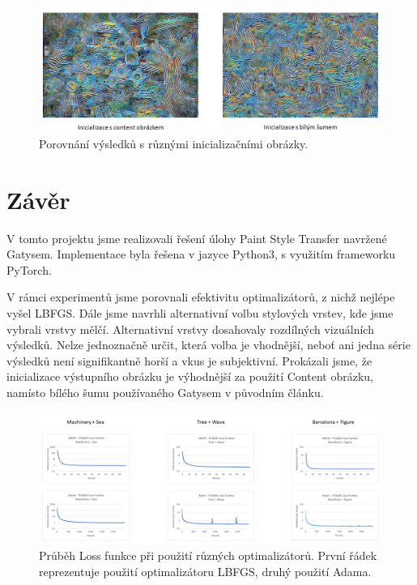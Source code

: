 \documentclass[twocolumn]{article}
\begin{document}
		\begin{figure}[h]
		\includegraphics[width=\linewidth]{ContentNoise.png}
		\caption{Porovnání výsledků s různými inicializačními obrázky. }
		\label{Noise}
	\end{figure}
	
	\section*{Závěr}
	V tomto projektu jsme realizovali řešení úlohy Paint Style Transfer navržené Gatysem. Implementace byla řešena v jazyce Python3, s využitím frameworku PyTorch.
	\par
	V rámci experimentů jsme porovnali efektivitu optimalizátorů, z nichž nejlépe vyšel LBFGS. Dále jsme navrhli alternativní volbu stylových vrstev, kde jsme vybrali vrstvy mělčí. Alternativní vrstvy dosahovaly rozdílných vizuálních výsledků. Nelze jednoznačně určit, která volba je vhodnější, neboť ani jedna série výsledků není signifikantně horší a vkus je subjektivní. Prokázali jsme, že inicializace výstupního obrázku je výhodnější za použití Content obrázku, namísto bílého šumu používaného Gatysem v původním článku.
	

		\begin{figure}[t]
		\includegraphics[width=18cm]{Ex1G_lez.png}
		\caption{Průběh Loss funkce při použití různých optimalizátorů. První řádek reprezentuje použití optimalizátoru LBFGS, druhý použití Adama.}
		\label{exp1G}
	\end{figure}
	
\end{document}
